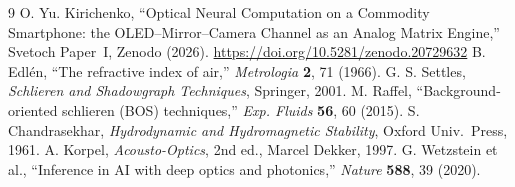 \documentclass[11pt]{article}
\begin{document}
\begin{thebibliography}{9}\small
{} O. Yu. Kirichenko, ``Optical Neural Computation on a Commodity Smartphone: the OLED--Mirror--Camera Channel as an Analog Matrix Engine,'' Svetoch Paper~I, Zenodo (2026). \url{https://doi.org/10.5281/zenodo.20729632}
 B. Edl\'en, ``The refractive index of air,'' \emph{Metrologia} \textbf{2}, 71 (1966).
 G. S. Settles, \emph{Schlieren and Shadowgraph Techniques}, Springer, 2001.
 M. Raffel, ``Background-oriented schlieren (BOS) techniques,'' \emph{Exp. Fluids} \textbf{56}, 60 (2015).
 S. Chandrasekhar, \emph{Hydrodynamic and Hydromagnetic Stability}, Oxford Univ.\ Press, 1961.
 A. Korpel, \emph{Acousto-Optics}, 2nd ed., Marcel Dekker, 1997.
 G. Wetzstein et al., ``Inference in AI with deep optics and photonics,'' \emph{Nature} \textbf{588}, 39 (2020).
\end{thebibliography}

\svetochfooter
\end{document}
